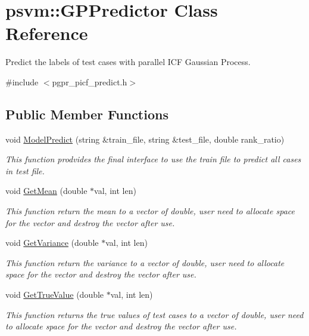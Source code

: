 \hypertarget{classpsvm_1_1_g_p_predictor}{\section{psvm\-:\-:G\-P\-Predictor Class Reference}
\label{classpsvm_1_1_g_p_predictor}
}


Predict the labels of test cases with parallel I\-C\-F Gaussian Process.  




{\ttfamily \#include $<$pgpr\-\_\-picf\-\_\-predict.\-h$>$}

\subsection*{Public Member Functions}
\begin{DoxyCompactItemize}
\item 
void \hyperlink{classpsvm_1_1_g_p_predictor_a401b72ee3267f091714ace9e0973bf01}{Model\-Predict} (string \&train\-\_\-file, string \&test\-\_\-file, double rank\-\_\-ratio)
\begin{DoxyCompactList}\small\item\em This function prodvides the final interface to use the train file to predict all cases in test file. \end{DoxyCompactList}\item 
void \hyperlink{classpsvm_1_1_g_p_predictor_a7141bfbe2731cf1ebcf7579da171b9a4}{Get\-Mean} (double $\ast$val, int len)
\begin{DoxyCompactList}\small\item\em This function return the mean to a vector of double, user need to allocate space for the vector and destroy the vector after use. \end{DoxyCompactList}\item 
void \hyperlink{classpsvm_1_1_g_p_predictor_a4c6662484395256ef10a337112022222}{Get\-Variance} (double $\ast$val, int len)
\begin{DoxyCompactList}\small\item\em This function return the variance to a vector of double, user need to allocate space for the vector and destroy the vector after use. \end{DoxyCompactList}\item 
void \hyperlink{classpsvm_1_1_g_p_predictor_a344dac46576dee127f0bf8e67cf53314}{Get\-True\-Value} (double $\ast$val, int len)
\begin{DoxyCompactList}\small\item\em This function returns the true values of test cases to a vector of double, user need to allocate space for the vector and destroy the vector after use. \end{DoxyCompactList}\item 

\end{DoxyCompactItemize}
